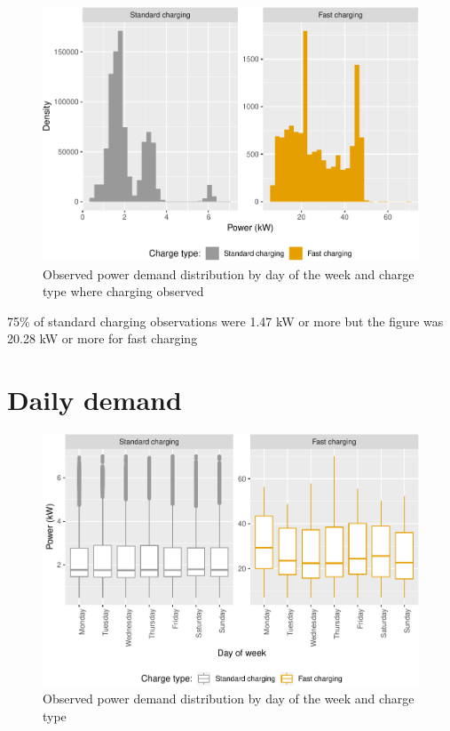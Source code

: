 \documentclass[]{article}
\begin{document}
\begin{figure}
\centering
\includegraphics{EVBB_report_files/figure-latex/obsPower-1.pdf}
\caption{\label{fig:obsPower}Observed power demand distribution by day of
the week and charge type where charging observed}
\end{figure}

75\% of standard charging observations were 1.47 kW or more but the
figure was 20.28 kW or more for fast charging

\section{Daily demand}\label{daily-demand}

\begin{figure}
\centering
\includegraphics{EVBB_report_files/figure-latex/dailyPower-1.pdf}
\caption{\label{fig:dailyPower}Observed power demand distribution by day of
the week and charge type}
\end{figure}
\end{document}
